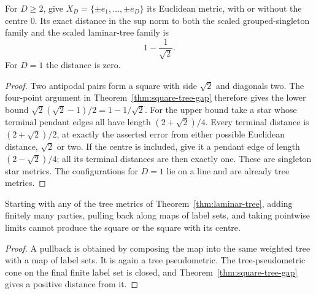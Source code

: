 \begin{corollary}
\label{cor:cross-polytope-tree-gap}
For $D\geq2$, give $X_D=\{\pm e_1,\ldots,\pm e_D\}$ its Euclidean metric, with or without the centre $0$.  Its exact distance in the sup norm to both the scaled grouped-singleton family and the scaled laminar-tree family is
\[
 1-\frac1{\sqrt2}.
\]
For $D=1$ the distance is zero.
\end{corollary}
\begin{proof}
Two antipodal pairs form a square with side $\sqrt2$ and diagonals two.  The four-point argument in Theorem~\ref{thm:square-tree-gap} therefore gives the lower bound $\sqrt2(\sqrt2-1)/2=1-1/\sqrt2$.  For the upper bound take a star whose terminal pendant edges all have length $(2+\sqrt2)/4$.  Every terminal distance is $(2+\sqrt2)/2$, at exactly the asserted error from either possible Euclidean distance, $\sqrt2$ or two.  If the centre is included, give it a pendant edge of length $(2-\sqrt2)/4$; all its terminal distances are then exactly one.  These are singleton star metrics.  The configurations for $D=1$ lie on a line and are already tree metrics.
\end{proof}

\begin{corollary}
\label{cor:tree-pullbacks}
Starting with any of the tree metrics of Theorem~\ref{thm:laminar-tree}, adding finitely many parties, pulling back along maps of label sets, and taking pointwise limits cannot produce the square or the square with its centre.
\end{corollary}
\begin{proof}
A pullback is obtained by composing the map into the same weighted tree with a map of label sets.  It is again a tree pseudometric.  The tree-pseudometric cone on the final finite label set is closed, and Theorem~\ref{thm:square-tree-gap} gives a positive distance from it.
\end{proof}

